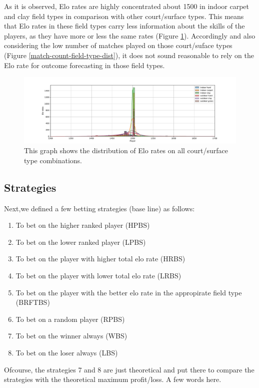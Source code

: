 \documentclass[preprint,aps,nofootinbib,a4paper,superscriptaddress,longbibliography,amsfonts,amssymb,amsmath,titlepage]{revtex4-2}
\begin{document}
As it is observed, Elo rates are highly concentrated about 1500 in indoor carpet and clay field types in comparison with other court/surface types. This means that Elo rates in these field types carry less information about the skills of the players, as they have more or less the same rates (Figure \ref{elo-rate-field-type-dist}). Accordingly and also considering the low number of matches played on those court/suface types (Figure \ref{match-count-field-type-dist}), it does not sound reasonable to rely on the Elo rate for outcome forecasting in those field types.
%
\begin{figure}[h]
\includegraphics[width=\textwidth]{pictures/elo-rate-field-type-dist.pdf}
\caption{This graph shows the distribution of Elo rates on all court/surface type combinations.}
\label{elo-rate-field-type-dist}
\end{figure}
%


\subsection{Strategies}

Next,we defined a few betting strategies (base line) as follows:
%
\begin{enumerate}
\item To bet on the higher ranked player (HPBS)
\item To bet on the lower ranked player (LPBS)
\item To bet on the player with higher total elo rate (HRBS)
\item To bet on the player with lower total elo rate (LRBS)
\item To bet on the player with the better elo rate in the appropirate field type (BRFTBS)
\item To bet on a random player (RPBS)
\item To bet on the winner always (WBS)
\item To bet on the loser always (LBS)
\end{enumerate}
%
Ofcourse, the strategies 7 and 8 are just theoretical and put there to compare the strategies with the theoretical maximum profit/loss.
A few words here.
\end{document}
